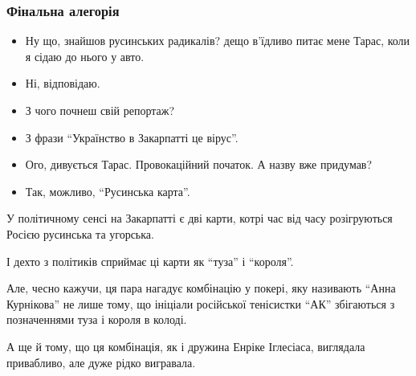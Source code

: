  
 
 

\subsubsection{Фінальна алегорія}

\begin{itemize}
  \item \dshM Ну що, знайшов русинських радикалів? \dshM дещо в’їдливо питає мене Тарас, коли я сідаю до нього у авто.
  \item \dshM Ні, \dshM відповідаю.
  \item \dshM З чого почнеш свій репортаж?
  \item \dshM З фрази \enquote{Українство в Закарпатті \dshM це вірус}.
  \item \dshM Ого, \dshM дивується Тарас. \dshM Провокаційний початок. А назву вже придумав?
  \item \dshM Так, можливо, \enquote{Русинська карта}.
\end{itemize}

У політичному сенсі на Закарпатті є дві карти, котрі час від часу розігруються
Росією \dshM русинська та угорська.

І дехто з політиків сприймає ці карти як \enquote{туза} і \enquote{короля}.

Але, чесно кажучи, ця пара нагадує комбінацію у покері, яку називають \enquote{Анна
Курнікова} \dshM не лише тому, що ініціали російської тенісистки \enquote{АК} збігаються з
позначеннями туза і короля в колоді.

А ще й тому, що ця комбінація, як і дружина Енріке Іглесіаса, виглядала
привабливо, але дуже рідко вигравала.
